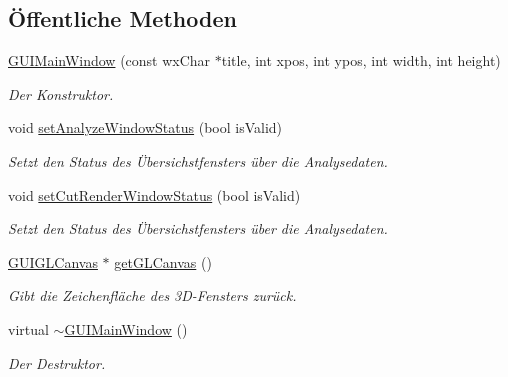 \subsection*{Öffentliche Methoden}
\begin{DoxyCompactItemize}
\item 
\hyperlink{classGUIMainWindow_a55cb97ffda12d79c6d6d50c9de35a3fe}{G\-U\-I\-Main\-Window} (const wx\-Char $\ast$title, int xpos, int ypos, int width, int height)
\begin{DoxyCompactList}\small\item\em Der Konstruktor. \end{DoxyCompactList}\item 
void \hyperlink{classGUIMainWindow_a64f6c71f9d92ab4091670ad1d264b2d7}{set\-Analyze\-Window\-Status} (bool is\-Valid)
\begin{DoxyCompactList}\small\item\em Setzt den Status des Übersichstfensters über die Analysedaten. \end{DoxyCompactList}\item 
void \hyperlink{classGUIMainWindow_a4b8b9293b800ca5ff47d1cb3a75f06a5}{set\-Cut\-Render\-Window\-Status} (bool is\-Valid)
\begin{DoxyCompactList}\small\item\em Setzt den Status des Übersichstfensters über die Analysedaten. \end{DoxyCompactList}\item 
\hyperlink{classGUIGLCanvas}{G\-U\-I\-G\-L\-Canvas} $\ast$ \hyperlink{classGUIMainWindow_a52e68b866f7835c3691fd8fad8ba910d}{get\-G\-L\-Canvas} ()
\begin{DoxyCompactList}\small\item\em Gibt die Zeichenfläche des 3\-D-\/\-Fensters zurück. \end{DoxyCompactList}\item 
virtual \hyperlink{classGUIMainWindow_a16ca27363f15a5f2678417bbf26880d2}{$\sim$\-G\-U\-I\-Main\-Window} ()
\begin{DoxyCompactList}\small\item\em Der Destruktor. \end{DoxyCompactList}\end{DoxyCompactItemize}
